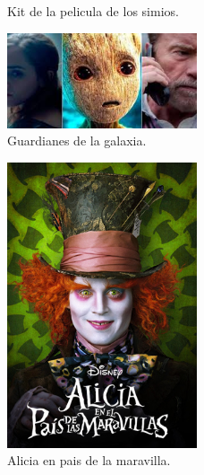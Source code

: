 \documentclass[12pt,letterpaper]{article}
\begin{document}
\begin{figure}[htbp]
\centering
{}
\caption{Kit de la pelicula de los simios.} \label{ima:5}
\end{figure}

\newpage
\begin{figure}[htb]
\centering
\includegraphics[width=0.5\textwidth]{./imagenes/6}
\caption{Guardianes de la galaxia.} \label{ima:6}
\end{figure}


\begin{figure}[htb]
\centering
\includegraphics[width=0.5\textwidth]{./imagenes/4}
\caption{Alicia en pais de la maravilla.} \label{ima:4}
\end{figure}
\end{document}

